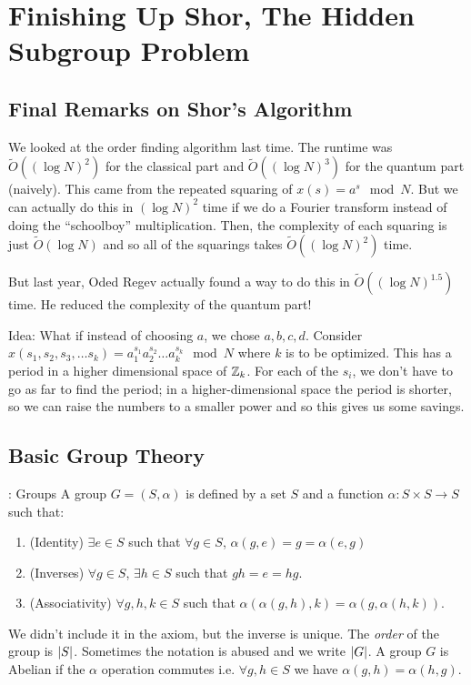 \section{Finishing Up Shor, The Hidden Subgroup Problem}

\subsection*{Final Remarks on Shor's Algorithm}
We looked at the order finding algorithm last time. The runtime was $\tilde{O}((\log N)^2)$ for the classical part and $\tilde{O}((\log N)^3)$ for the quantum part (naively). This came from the repeated squaring of $x(s) = a^s\mod N$. But we can actually do this in $(\log N)^2$ time if we do a Fourier transform instead of doing the ``schoolboy'' multiplication. Then, the complexity of each squaring is just $\tilde{O}(\log N)$ and so all of the squarings takes $\tilde{O}((\log N)^2)$ time.

But last year, Oded Regev actually found a way to do this in $\tilde{O}((\log N)^{1.5})$ time. He reduced the complexity of the quantum part!

Idea: What if instead of choosing $a$, we chose $a, b, c, d$. Consider $x(s_1, s_2, s_3, \ldots s_k) = a_1^{s_1}a_2^{s_2}\ldots a_k^{s_k} \mod N$ where $k$ is to be optimized. This has a period in a higher dimensional space of $\mathbb{Z}_k$. For each of the $s_i$, we don't have to go as far to find the period; in a higher-dimensional space the period is shorter, so we can raise the numbers to a smaller power and so this gives us some savings.

\subsection*{Basic Group Theory}
\begin{defbox}{: Groups}
    A group $G = (S, \alpha)$ is defined by a set $S$ and a function $\alpha: S \times S \to S$ such that:
    \begin{enumerate}
        \item (Identity) $\exists e \in S$ such that $\forall g \in S$, $\alpha(g, e) = g = \alpha(e, g)$
        \item (Inverses) $\forall g \in S$, $\exists h \in S$ such that $gh = e = hg$. 
        \item (Associativity) $\forall g, h, k \in S$ such that $\alpha(\alpha(g,h), k) = \alpha(g, \alpha(h, k))$. 
    \end{enumerate}
    We didn't include it in the axiom, but the inverse is unique. The \emph{order} of the group is $\lvert S \rvert$. Sometimes the notation is abused and we write $\lvert G \rvert$. A group $G$ is Abelian if the $\alpha$ operation commutes i.e. $\forall g, h \in S$ we have $\alpha(g, h) = \alpha(h, g)$. 
\end{defbox}

